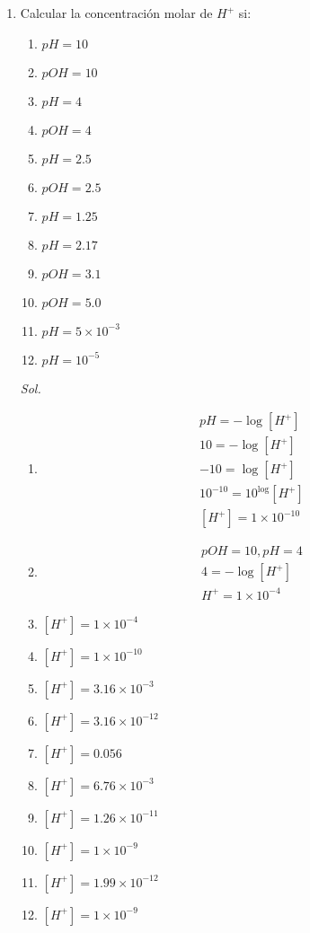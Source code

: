 \begin{enumerate}
	\item Calcular la concentración molar de $H^+$ si:

	      \begin{enumerate}
		      \item $pH=10$
		      \item $pOH=10$
		      \item $pH=4$
		      \item $pOH=4$
		      \item $pH=2.5$
		      \item $pOH=2.5$
		      \item $pH=1.25$
		      \item $pH=2.17$
		      \item $pOH=3.1$
		      \item $pOH=5.0$
		      \item $pH=5\times10^{-3}$
		      \item $pH=10^{-5}$
	      \end{enumerate}

	      \textit{ Sol. }

	      \begin{enumerate}
		      \item \begin{align*}
			             & pH=-\log[H^+]           \\
			             & 10=-\log[H^+]           \\
			             & -10=\log[H^+]           \\
			             & 10^{-10}=10^{\log}[H^+] \\
			             & [H^+]=1\times10^{-10}
		            \end{align*}
		      \item \begin{align*}
			             & pOH=10,pH=4        \\
			             & 4=-\log[H^+]       \\
			             & H^+=1\times10^{-4}
		            \end{align*}
		      \item $[H^+]=1\times10^{-4}$
		      \item $[H^+]=1\times10^{-10}$
		      \item $[H^+]=3.16\times10^{-3}$
		      \item $[H^+]=3.16\times10^{-12}$
		      \item $[H^+]=0.056$
		      \item $[H^+]=6.76\times10^{-3}$
		      \item $[H^+]=1.26\times10^{-11}$
		      \item $[H^+]=1\times10^{-9}$
		      \item $[H^+]=1.99\times10^{-12}$
		      \item $[H^+]=1\times10^{-9}$
	      \end{enumerate}
\end{enumerate}